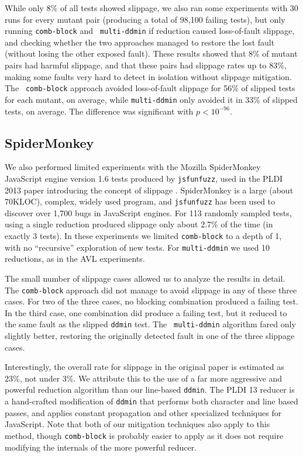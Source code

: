 While only 8\% of all
tests showed slippage, we also ran some experiments with 30 runs for
every mutant pair (producing a total of 98,100 failing tests), but only running {\tt comb-block} and {\tt
  multi-ddmin} if reduction caused  loss-of-fault slippage, and
checking whether the two approaches managed to restore the lost fault
(without losing the other exposed fault).  These
results showed that 8\% of mutant pairs had harmful slippage, and that these
pairs had slippage rates up to 83\%, making some faults very
hard to detect in isolation without slippage mitigation.  The {\tt
  comb-block} approach avoided loss-of-fault slippage for 56\% of
slipped tests for each mutant, on average, while {\tt multi-ddmin}
only avoided it in 33\% of slipped tests, on average.  The difference
was significant with $p < 10^{-96}$.

\subsection{SpiderMonkey}

We also performed limited experiments with the Mozilla
SpiderMonkey JavaScript engine version 1.6 tests produced by {\tt jsfunfuzz}, used in the PLDI 2013 paper introducing
the concept of slippage \cite{PLDI13}.  SpiderMonkey is a large (about
70KLOC), complex, widely used program, and {\tt jsfunfuzz}
\cite{jsfunfuzz} has been used to discover over 1,700 bugs in
JavaScript engines.  For 113 randomly sampled
tests, using a single reduction produced slippage only about 2.7\% of the
time (in exactly 3 tests).  In these experiments we limited
{\tt comb-block} to a depth of 1, with no ``recursive'' exploration of
new tests.  For {\tt multi-ddmin} we used 10 reductions, as in the AVL experiments.

The small number of slippage cases
allowed us to analyze the results in detail.  The {\tt comb-block} approach did
not manage to avoid slippage in any of these three cases.  For two
of the three cases, no blocking combination produced a failing test.
In the third case, one combination did produce a failing test, but it
reduced to the same fault as the slipped {\tt ddmin} test.  The {\tt
  multi-ddmin} algorithm fared only slightly better, restoring the
originally detected fault in one of the three slippage cases.

Interestingly, the overall rate for slippage in the original paper is
estimated as 23\%, not under 3\%.  We attribute this to the use of a
far more aggressive and powerful reduction algorithm than our
line-based {\tt ddmin}.  The PLDI 13 reducer is a hand-crafted
modification of {\tt ddmin} that performs both character and line
based passes, and applies constant propagation and other specialized
techniques for JavaScript.  Note that both of our mitigation
techniques also apply to this method, though {\tt comb-block} is
probably easier to apply as it does not require modifying the internals of the
more powerful reducer.

